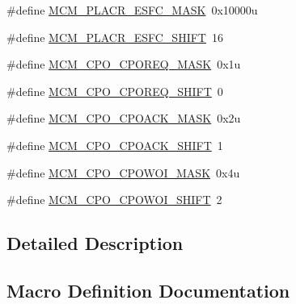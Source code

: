 \begin{DoxyCompactItemize}
\item 
\#define \hyperlink{group___m_c_m___register___masks_gadfd414b0c13cb1d199238e5a312a153d}{M\+C\+M\+\_\+\+P\+L\+A\+C\+R\+\_\+\+E\+S\+F\+C\+\_\+\+M\+A\+SK}~0x10000u
\item 
\#define \hyperlink{group___m_c_m___register___masks_gae370a0400b2ce8cef0416ee11b9898f8}{M\+C\+M\+\_\+\+P\+L\+A\+C\+R\+\_\+\+E\+S\+F\+C\+\_\+\+S\+H\+I\+FT}~16
\item 
\#define \hyperlink{group___m_c_m___register___masks_ga36f43d6467fbe16e5585829747471da9}{M\+C\+M\+\_\+\+C\+P\+O\+\_\+\+C\+P\+O\+R\+E\+Q\+\_\+\+M\+A\+SK}~0x1u
\item 
\#define \hyperlink{group___m_c_m___register___masks_ga4787ad168d88290f8da659a6b30e243d}{M\+C\+M\+\_\+\+C\+P\+O\+\_\+\+C\+P\+O\+R\+E\+Q\+\_\+\+S\+H\+I\+FT}~0
\item 
\#define \hyperlink{group___m_c_m___register___masks_ga039f47e9952c17908e79eace8fd0139c}{M\+C\+M\+\_\+\+C\+P\+O\+\_\+\+C\+P\+O\+A\+C\+K\+\_\+\+M\+A\+SK}~0x2u
\item 
\#define \hyperlink{group___m_c_m___register___masks_gaa9a8977b3a452ae07fb7ca851c5ee47e}{M\+C\+M\+\_\+\+C\+P\+O\+\_\+\+C\+P\+O\+A\+C\+K\+\_\+\+S\+H\+I\+FT}~1
\item 
\#define \hyperlink{group___m_c_m___register___masks_ga154f71ae507ca3bac1e2c2a9dbd1dcd5}{M\+C\+M\+\_\+\+C\+P\+O\+\_\+\+C\+P\+O\+W\+O\+I\+\_\+\+M\+A\+SK}~0x4u
\item 
\#define \hyperlink{group___m_c_m___register___masks_ga369c1ed9bf00d8317ea868b2ea1b0572}{M\+C\+M\+\_\+\+C\+P\+O\+\_\+\+C\+P\+O\+W\+O\+I\+\_\+\+S\+H\+I\+FT}~2
\end{DoxyCompactItemize}


\subsection{Detailed Description}


\subsection{Macro Definition Documentation}
\mbox{\label{group___m_c_m___register___masks_ga039f47e9952c17908e79eace8fd0139c}} 
